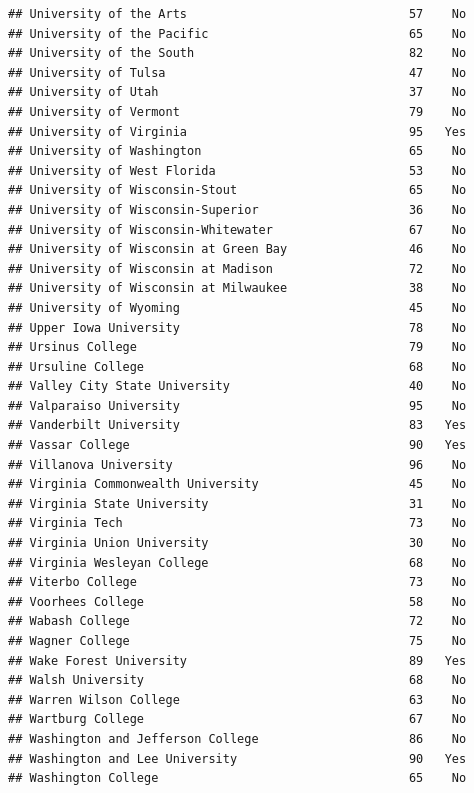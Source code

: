 \documentclass[
]{article}
\begin{document}
\begin{verbatim}
## University of the Arts                               57    No
## University of the Pacific                            65    No
## University of the South                              82    No
## University of Tulsa                                  47    No
## University of Utah                                   37    No
## University of Vermont                                79    No
## University of Virginia                               95   Yes
## University of Washington                             65    No
## University of West Florida                           53    No
## University of Wisconsin-Stout                        65    No
## University of Wisconsin-Superior                     36    No
## University of Wisconsin-Whitewater                   67    No
## University of Wisconsin at Green Bay                 46    No
## University of Wisconsin at Madison                   72    No
## University of Wisconsin at Milwaukee                 38    No
## University of Wyoming                                45    No
## Upper Iowa University                                78    No
## Ursinus College                                      79    No
## Ursuline College                                     68    No
## Valley City State University                         40    No
## Valparaiso University                                95    No
## Vanderbilt University                                83   Yes
## Vassar College                                       90   Yes
## Villanova University                                 96    No
## Virginia Commonwealth University                     45    No
## Virginia State University                            31    No
## Virginia Tech                                        73    No
## Virginia Union University                            30    No
## Virginia Wesleyan College                            68    No
## Viterbo College                                      73    No
## Voorhees College                                     58    No
## Wabash College                                       72    No
## Wagner College                                       75    No
## Wake Forest University                               89   Yes
## Walsh University                                     68    No
## Warren Wilson College                                63    No
## Wartburg College                                     67    No
## Washington and Jefferson College                     86    No
## Washington and Lee University                        90   Yes
## Washington College                                   65    No

\end{verbatim}
\end{document}
